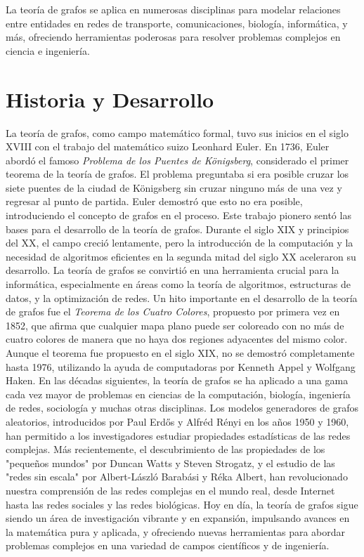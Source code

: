 \documentclass[12pt]{book}
\begin{document}
La teoría de grafos se aplica en numerosas disciplinas para modelar relaciones entre entidades en redes de transporte, comunicaciones, biología, informática, y más, ofreciendo herramientas poderosas para resolver problemas complejos en ciencia e ingeniería.

\section{Historia y Desarrollo}

La teoría de grafos, como campo matemático formal, tuvo sus inicios en el siglo XVIII con el trabajo del matemático suizo Leonhard Euler. En 1736, Euler abordó el famoso \textit{Problema de los Puentes de Königsberg}, considerado el primer teorema de la teoría de grafos. El problema preguntaba si era posible cruzar los siete puentes de la ciudad de Königsberg sin cruzar ninguno más de una vez y regresar al punto de partida. Euler demostró que esto no era posible, introduciendo el concepto de grafos en el proceso.
Este trabajo pionero sentó las bases para el desarrollo de la teoría de grafos. Durante el siglo XIX y principios del XX, el campo creció lentamente, pero la introducción de la computación y la necesidad de algoritmos eficientes en la segunda mitad del siglo XX aceleraron su desarrollo. La teoría de grafos se convirtió en una herramienta crucial para la informática, especialmente en áreas como la teoría de algoritmos, estructuras de datos, y la optimización de redes.
Un hito importante en el desarrollo de la teoría de grafos fue el \textit{Teorema de los Cuatro Colores}, propuesto por primera vez en 1852, que afirma que cualquier mapa plano puede ser coloreado con no más de cuatro colores de manera que no haya dos regiones adyacentes del mismo color. Aunque el teorema fue propuesto en el siglo XIX, no se demostró completamente hasta 1976, utilizando la ayuda de computadoras por Kenneth Appel y Wolfgang Haken.
En las décadas siguientes, la teoría de grafos se ha aplicado a una gama cada vez mayor de problemas en ciencias de la computación, biología, ingeniería de redes, sociología y muchas otras disciplinas. Los modelos generadores de grafos aleatorios, introducidos por Paul Erdős y Alfréd Rényi en los años 1950 y 1960, han permitido a los investigadores estudiar propiedades estadísticas de las redes complejas. Más recientemente, el descubrimiento de las propiedades de los "pequeños mundos" por Duncan Watts y Steven Strogatz, y el estudio de las "redes sin escala" por Albert-László Barabási y Réka Albert, han revolucionado nuestra comprensión de las redes complejas en el mundo real, desde Internet hasta las redes sociales y las redes biológicas.
Hoy en día, la teoría de grafos sigue siendo un área de investigación vibrante y en expansión, impulsando avances en la matemática pura y aplicada, y ofreciendo nuevas herramientas para abordar problemas complejos en una variedad de campos científicos y de ingeniería.
\end{document}
